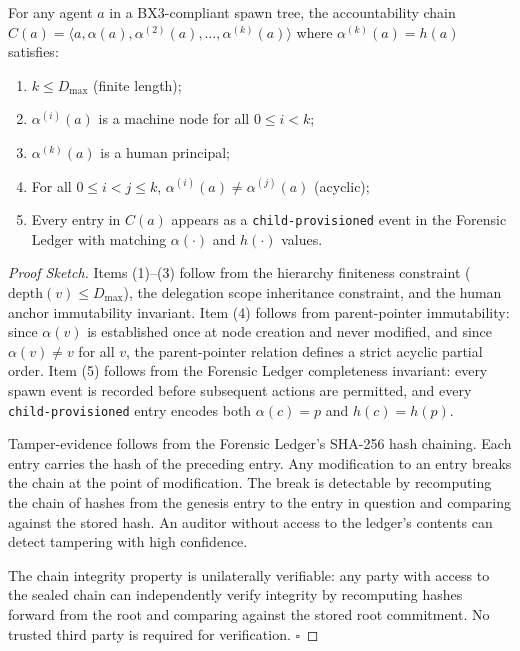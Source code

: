 \begin{property}
\label{prop:chain-integrity}
For any agent $a$ in a BX3-compliant spawn tree, the accountability chain
$C(a) = \langle a, \alpha(a), \alpha^{(2)}(a), \ldots, \alpha^{(k)}(a) \rangle$
where $\alpha^{(k)}(a) = h(a)$ satisfies:
\begin{enumerate}
  \item $k \leq D_{\max}$ (finite length);
  \item $\alpha^{(i)}(a)$ is a machine node for all $0 \leq i < k$;
  \item $\alpha^{(k)}(a)$ is a human principal;
  \item For all $0 \leq i < j \leq k$, $\alpha^{(i)}(a) \neq \alpha^{(j)}(a)$ (acyclic);
  \item Every entry in $C(a)$ appears as a \texttt{child-provisioned} event in the Forensic Ledger with matching $\alpha(\cdot)$ and $h(\cdot)$ values.
\end{enumerate}
\end{property}

\begin{proof}[Proof Sketch]
Items (1)--(3) follow from the hierarchy finiteness constraint ($\text{depth}(v) \leq D_{\max}$), the delegation scope inheritance constraint, and the human anchor immutability invariant. Item (4) follows from parent-pointer immutability: since $\alpha(v)$ is established once at node creation and never modified, and since $\alpha(v) \neq v$ for all $v$, the parent-pointer relation defines a strict acyclic partial order. Item (5) follows from the Forensic Ledger completeness invariant: every spawn event is recorded before subsequent actions are permitted, and every \texttt{child-provisioned} entry encodes both $\alpha(c) = p$ and $h(c) = h(p)$.

Tamper-evidence follows from the Forensic Ledger's SHA-256 hash chaining. Each entry carries the hash of the preceding entry. Any modification to an entry breaks the chain at the point of modification. The break is detectable by recomputing the chain of hashes from the genesis entry to the entry in question and comparing against the stored hash. An auditor without access to the ledger's contents can detect tampering with high confidence.

The chain integrity property is unilaterally verifiable: any party with access to the sealed chain can independently verify integrity by recomputing hashes forward from the root and comparing against the stored root commitment. No trusted third party is required for verification. $\square$
\end{proof}


